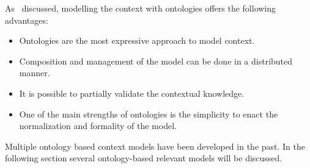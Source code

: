 

As~\citet{strang_context_2004} discussed, modelling the context with
ontologies offers the following advantages:
\begin{itemize}
  \item Ontologies are the most expressive approach to model context.
  \item Composition and management of the model can be done in a distributed 
  manner.
  \item It is possible to partially validate the contextual knowledge.
  \item One of the main strengths of ontologies is the simplicity to enact 
  the normalization and formality of the model.
\end{itemize}

Multiple ontology based context models have been developed in the past. In the 
following section several ontology-based relevant models will be discussed.




